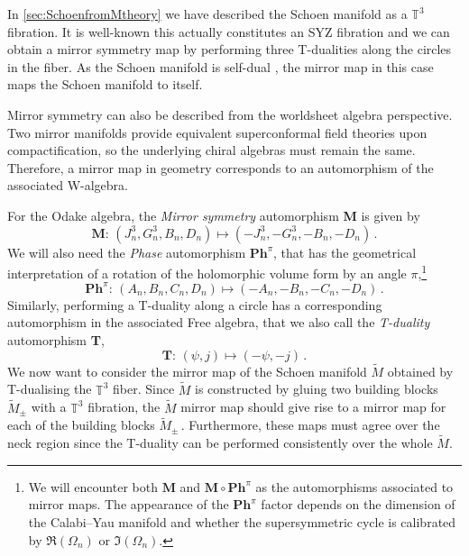\documentclass{pspum-l}
\theoremstyle{definition}
\theoremstyle{remark}
\numberwithin{equation}{section}
\begin{document}
\label{sec:Schoenautomorphisms}


In \cref{sec:SchoenfromMtheory} we have described the Schoen manifold as a $\mathbb{T}^3$ fibration. It is well-known this actually constitutes an SYZ fibration \cite{Strominger:1996it} and we can obtain a mirror symmetry map by performing three T-dualities along the circles in the fiber. As the Schoen manifold is self-dual \cite{Hosono:1997hp}, the mirror map in this case maps the Schoen manifold to itself.

Mirror symmetry can also be described from the worldsheet algebra perspective. Two mirror manifolds provide equivalent superconformal field theories upon compactification, so the underlying chiral algebras must remain the same. Therefore, a mirror map in geometry corresponds to an automorphism of the associated W-algebra.

For the Odake algebra, the \emph{Mirror symmetry} automorphism \textbf{M} is given by
\begin{equation}
    \textbf{M}:\,\left(J^3_n,G^3_n,B_n,D_n\right)\longmapsto \left(-J^3_n,-G^3_n,-B_n,-D_n\right)\, .
\end{equation}
We will also need the \emph{Phase} automorphism $\textbf{Ph}^\pi$, that has the geometrical interpretation of a rotation of the holomorphic volume form by an angle $\pi$,\footnote{We will encounter both $\textbf{M}$ and $\textbf{M}\circ\textbf{Ph}^\pi$ as the automorphisms associated to mirror maps. The appearance of the $\textbf{Ph}^\pi$ factor depends on the dimension of the Calabi--Yau manifold and whether the supersymmetric cycle is calibrated by $\Re(\Omega_n)$ or $\Im(\Omega_n)$.}
\begin{equation}
    \textbf{Ph}^\pi:\,\left(A_n,B_n,C_n,D_n\right)\longmapsto \left(-A_n,-B_n,-C_n,-D_n\right)\, .
\end{equation}
Similarly, performing a T-duality along a circle has a corresponding automorphism in the associated Free algebra, that we also call the \emph{T-duality} automorphism \textbf{T},
\begin{equation}
    \textbf{T}:\,\left(\psi,j\right)\longmapsto \left(-\psi,-j\right)\, .
\end{equation}
We now want to consider the mirror map of the Schoen manifold $\widetilde{M}$ obtained by T-dualising the $\mathbb{T}^3$ fiber. Since $\widetilde{M}$ is constructed by gluing two building blocks $\widetilde{M}_\pm$ with a $\mathbb{T}^3$ fibration, the $\widetilde{M}$ mirror map should give rise to a mirror map for each of the building blocks $\widetilde{M}_\pm\,$. Furthermore, these maps must agree over the neck region since the T-duality can be performed consistently over the whole $\widetilde{M}$.
\end{document}

